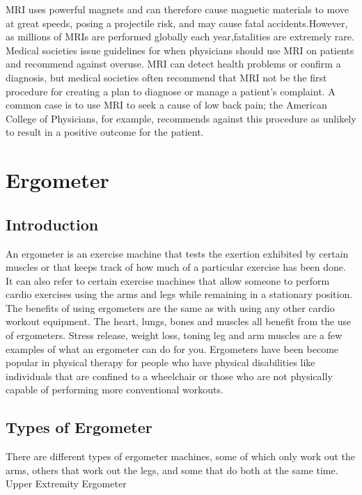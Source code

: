 \documentclass[12pt]{article}
\begin{document}
MRI uses powerful magnets and can therefore cause magnetic materials to move at great speeds, posing a projectile risk, and may cause fatal accidents.However, as millions of MRIs are performed globally each year,fatalities are extremely rare.\\Medical societies issue guidelines for when physicians should use MRI on patients and recommend against overuse. MRI can detect health problems or confirm a diagnosis, but medical societies often recommend that MRI not be the first procedure for creating a plan to diagnose or manage a patient's complaint. A common case is to use MRI to seek a cause of low back pain; the American College of Physicians, for example, recommends against this procedure as unlikely to result in a positive outcome for the patient.
\section{Ergometer}
\subsection{Introduction}
An ergometer is an exercise machine that tests the exertion exhibited by certain muscles or that keeps track of how much of a particular exercise has been done. It can also refer to certain exercise machines that allow someone to perform cardio exercises using the arms and legs while remaining in a stationary position.\\The benefits of using ergometers are the same as with using any other cardio workout equipment. The heart, lungs, bones and muscles all benefit from the use of ergometers. Stress release, weight loss, toning leg and arm muscles are a few examples of what an ergometer can do for you. Ergometers have been become popular in physical therapy for people who have physical disabilities like individuals that are confined to a wheelchair or those who are not physically capable of performing more conventional workouts.
\subsection{Types of Ergometer}
There are different types of ergometer machines, some of which only work out the arms, others that work out the legs, and some that do both at the same time.\\

Upper Extremity Ergometer\\
\end{document}
